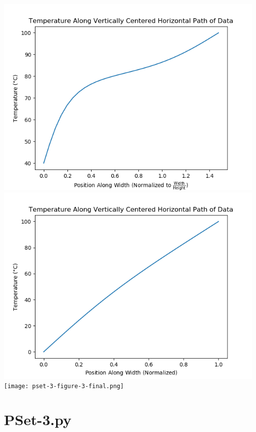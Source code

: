 \documentclass[12pt]{article}
\begin{document}
\includegraphics[width=\textwidth]{pset-3-figure-1.png}
\clearpage
\includegraphics[width=\textwidth]{pset-3-figure-2.png}
\clearpage
\texttt{[image: pset-3-figure-3-final.png]}
\clearpage

\section{PSet-3.py}

\end{document}
